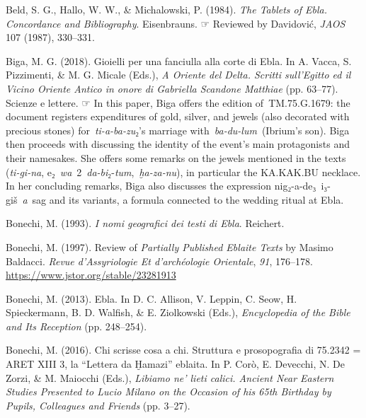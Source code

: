 \documentclass[
]{book}
\newlength{\cslhangindent}
\newlength{\cslentryspacingunit} %
\newenvironment{CSLReferences}[2] %
 {%
  \setlength{\parindent}{0pt}
  \ifodd #1
  \let\oldpar\par
  \def\par{\hangindent=\cslhangindent\oldpar}
  \fi
  \setlength{\parskip}{#2\cslentryspacingunit}
 }%
 {}
\newcommand{\CSLBlock}[1]{#1\hfill\break}
\begin{document}
\begin{CSLReferences}{1}{0}
\leavevmode{}%
Beld, S. G., Hallo, W. W., \& Michalowski, P. (1984). \emph{The {Tablets} of {Ebla}. {Concordance} and {Bibliography}}. Eisenbrauns.
\CSLBlock{\newline☞ Reviewed by Davidović, \emph{JAOS} 107 (1987), 330--331.}

\leavevmode{}%
Biga, M. G. (2018). Gioielli per una fanciulla alla corte di Ebla. In A. Vacca, S. Pizzimenti, \& M. G. Micale (Eds.), \emph{A Oriente del Delta. Scritti sull'Egitto ed il Vicino Oriente Antico in onore di Gabriella Scandone Matthiae} (pp. 63--77). Scienze e lettere.
\CSLBlock{\newline☞ In this paper, Biga offers the edition of~TM.75.G.1679: the document registers expenditures of gold, silver, and jewels (also decorated with precious stones) for~\emph{ti-a-ba-zu}₂'s marriage with~\emph{ba-du-lum}~(Ibrium's son). Biga then proceeds with discussing the identity of the event's main protagonists and their namesakes. She offers some remarks on the jewels mentioned in the texts (\emph{ti-gi-na}, e₂~\emph{wa}~2~\emph{da-bi}₂-\emph{tum},~\emph{ḫa-za-nu}), in particular the KA.KAK.BU necklace. In her concluding remarks, Biga also discusses the expression nig₂-a-de₃~i₃-giš~\emph{a}~sag and its variants, a formula connected to the wedding ritual at Ebla.}

\leavevmode{}%
Bonechi, M. (1993). \emph{I nomi geografici dei testi di Ebla}. Reichert.

\leavevmode{}%
Bonechi, M. (1997). Review of {\emph{Partially Published Eblaite Texts}} by {Masimo Baldacci}. \emph{Revue d'Assyriologie Et d'archéologie Orientale}, \emph{91}, 176--178. \url{https://www.jstor.org/stable/23281913}

\leavevmode{}%
Bonechi, M. (2013). Ebla. In D. C. Allison, V. Leppin, C. Seow, H. Spieckermann, B. D. Walfish, \& E. Ziolkowski (Eds.), \emph{Encyclopedia of the {Bible} and {Its Reception}} (pp. 248--254).

\leavevmode{}%
Bonechi, M. (2016). Chi scrisse cosa a chi. Struttura e prosopografia di 75.2342 = ARET XIII 3, la {``Lettera da Ḫamazi''} eblaita. In P. Corò, E. Devecchi, N. De Zorzi, \& M. Maiocchi (Eds.), \emph{Libiamo ne' lieti calici. Ancient Near Eastern Studies Presented to Lucio Milano on the Occasion of his 65th Birthday by Pupils, Colleagues and Friends} (pp. 3--27).


\end{CSLReferences}
\end{document}
